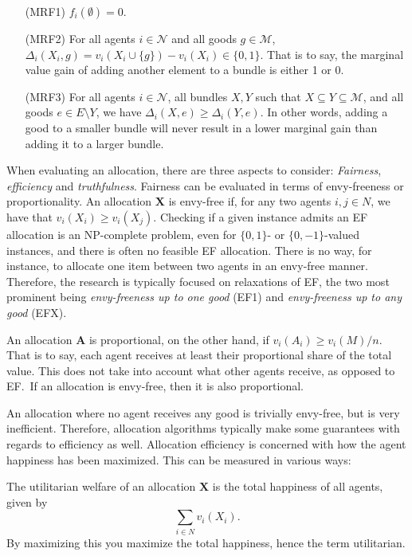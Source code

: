 \begin{enumerate}[align=left]
  \item [(MRF1)] $f_i(\emptyset) = 0$.
  \item [(MRF2)] For all agents $i \in \mathcal{N}$ and all goods $g \in \mathcal{M}$, $\Delta_i(X_i, g) = v_i(X_i \cup \{ g \}) - v_i(X_i) \in \{ 0,1 \}$. That is to say, the marginal value gain of adding another element to a bundle is either 1 or 0.
  \item [(MRF3)] For all agents $i \in \mathcal{N}$, all bundles $X, Y$ such that $X \subseteq Y \subseteq \mathcal{M}$, and all goods $e \in E \setminus Y$, we have $\Delta_i(X, e) \geq \Delta_i(Y, e)$. In other words, adding a good to a smaller bundle will never result in a lower marginal gain than adding it to a larger bundle.
\end{enumerate}

When evaluating an allocation, there are three aspects to consider: \textit{Fairness}, \textit{efficiency} and \textit{truthfulness}. Fairness can be evaluated in terms of envy-freeness or proportionality. An allocation $\textbf{X}$ is envy-free if, for any two agents $i, j \in N$, we have that $v_i(X_i) \geq v_i(X_j)$. Checking if a given instance admits an EF allocation is an NP-complete problem, even for $\{0, 1\}$- or $\{0, -1\}$-valued instances, and there is often no feasible EF allocation. There is no way, for instance, to allocate one item between two agents in an envy-free manner. Therefore, the research is typically focused on relaxations of EF, the two most prominent being \textit{envy-freeness up to one good} (EF1) and \textit{envy-freeness up to any good} (EFX).

An allocation $\textbf{A}$ is proportional, on the other hand, if $v_i(A_i) \geq v_i(M) / n$. That is to say, each agent receives at least their proportional share of the total value. This does not take into account what other agents receive, as opposed to EF.\ If an allocation is envy-free, then it is also proportional.

An allocation where no agent receives any good is trivially envy-free, but is very inefficient. Therefore, allocation algorithms typically make some guarantees with regards to efficiency as well. Allocation efficiency is concerned with how the agent happiness has been maximized. This can be measured in various ways:

The utilitarian welfare of an allocation $\textbf{X}$ is the total happiness of all agents, given by \[\sum_{i \in N} v_i(X_i).\] By maximizing this you maximize the total happiness, hence the term utilitarian.

